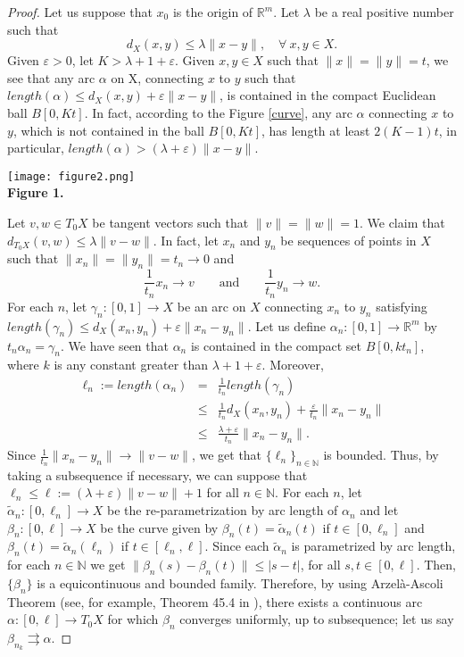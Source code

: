 \documentclass{amsart}
\makeatletter
\newcommand{\R}{\mathbb{R}}
\newcommand{\N}{\mathbb{N}}
\newcommand{\mlabel}[2]{\def\@currentlabel{#2}\label{#1}} %
\makeatother
\begin{document}
\begin{proof} Let us suppose that $x_0$ is the origin of $\R^m$. Let $\lambda$ be a real positive number such that  $$d_X(x,y)\leq \lambda \|x-y\|, \quad \forall \ x,y\in X.$$
Given $\varepsilon >0$, let $K>\lambda+1+\varepsilon $. Given $x,y\in X$ such that $\|x\|=\|y\|=t$, we see that any arc $\alpha$ on X, connecting $x$ to $y$ such that $length(\alpha)\leq d_X(x,y)+\varepsilon \|x-y\|$, is contained in the compact Euclidean ball $B[0,Kt]$. In fact, according to the Figure \ref{curve}, any arc $\alpha$ connecting $x$ to $y$, which is not contained in the ball $B[0,Kt]$, has length at least $2(K-1)t$, in particular, $length(\alpha)>(\lambda+\varepsilon )\| x- y \|$.

\begin{center}\mlabel{curve}{1}
\texttt{[image: figure2.png]}\\
{\bf Figure 1.}
\end{center}

Let $v,w\in T_0X$ be tangent vectors such that $\|v\|=\|w\|=1$. We claim that $d_{T_0X}(v,w)\leq \lambda \|v-w\|$. In fact, let $x_n$ and $y_n$ be sequences of points in $X$ such that $\|x_n\|=\|y_n\|=t_n\to 0$ and $$\frac{1}{t_n}x_n\to v \quad \quad  \mbox{and} \quad \quad \frac{1}{t_n}y_n\to w.$$ For each $n$, let $\gamma_n\colon[0,1]\rightarrow X$ be an arc on $X$ connecting $x_n$ to $y_n$ satisfying $length(\gamma_n)\leq d_X(x_n,y_n)+\varepsilon \|x_n-y_n\|$. Let us define $\alpha_n\colon[0,1]\rightarrow \R^m$ by $t_n\alpha_n=\gamma_n$. We have seen that $\alpha_n$ is contained in the compact set $B[0,kt_n]$, where $k$ is any constant greater than $\lambda+1+\varepsilon $. Moreover,
\begin{eqnarray*}
\ell_n:=length(\alpha_n)&=&\frac{1}{t_n}length(\gamma_n) \\
&\leq & \frac{1}{t_n}d_X(x_n,y_n) +\frac{\varepsilon}{t_n}\|x_n-y_n\|\\
&\leq &\frac{\lambda+\varepsilon}{t_n} \|x_n-y_n\|.
\end{eqnarray*}
Since $\displaystyle\frac{1}{t_n} \| x_n-y_n\| \to \| v-w\|$, we get that $\{\ell_n\}_{n\in \N}$ is bounded. Thus, by taking a subsequence if necessary, we can suppose that $\ell_n\leq \ell:=(\lambda+\varepsilon) \|v-w\|+1$ for all $n\in \N$. For each $n$, let $\widetilde \alpha_n:[0,\ell_n]\to X$ be the re-parametrization by arc length of $\alpha_n$ and let $\beta_n:[0,\ell]\to X$ be the curve given by $\beta_n(t)=\widetilde\alpha_n(t)$ if $t\in [0,\ell_n]$ and $\beta_n(t)=\widetilde \alpha_n(\ell_n)$ if $t\in [\ell_n, \ell]$. Since each $\widetilde \alpha_n$ is parametrized by arc length, for each $n\in \N$ we get $\|\beta_n(s)-\beta_n(t)\|\leq |s-t|$, for all $s,t\in[0,\ell]$. Then, $\{\beta_n\}$ is a equicontinuous and bounded family. Therefore, by using Arzel\`a-Ascoli Theorem (see, for example, Theorem 45.4 in \cite{Munkres:2014}), there exists a continuous arc $\alpha\colon [0,\ell]\rightarrow T_0X$ for which $\beta_n$ converges uniformly, up to subsequence; let us say $\beta_{n_k}\rightrightarrows\alpha$. %


\end{proof}
\end{document}
